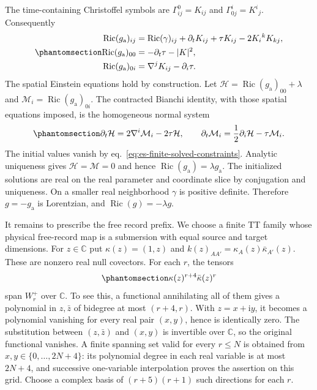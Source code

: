 \documentclass[
  english,
  11pt,
  reqno]{amsart}
\begin{document}
The time-containing Christoffel symbols are \(\Gamma^0_{ij}=K_{ij}\) and
\(\Gamma^i_{0j}=K^i{}_j\). Consequently
\begin{equation}\protect\phantomsection\label{eq:es-finite-gaussian-ricci}{\begin{aligned}
\operatorname{Ric}(g_{\mathrm a})_{ij}
 &=\operatorname{Ric}(\gamma)_{ij}
     +\partial_tK_{ij}+\tau K_{ij}-2K_i{}^kK_{kj}, \\
\operatorname{Ric}(g_{\mathrm a})_{00}&=-\partial_t\tau-|K|^2, \\
\operatorname{Ric}(g_{\mathrm a})_{0i}&=\nabla^jK_{ij}-\partial_i\tau.
\end{aligned}}\end{equation} The spatial Einstein equations hold by construction. Let
\(\mathcal H=\operatorname{Ric}(g_{\mathrm a})_{00}+\lambda\) and
\(\mathcal M_i=\operatorname{Ric}(g_{\mathrm a})_{0i}\). The contracted
Bianchi identity, with those spatial equations imposed, is the
homogeneous normal system
\begin{equation}\protect\phantomsection\label{eq:es-finite-constraint-propagation}{
 \partial_t\mathcal H
 =2\nabla^i\mathcal M_i-2\tau\mathcal H,
 \qquad
 \partial_t\mathcal M_i
 =\frac12\partial_i\mathcal H-\tau\mathcal M_i.
}\end{equation} The initial values vanish by
eq.~\ref{eq:es-finite-solved-constraints}. Analytic uniqueness gives
\(\mathcal H=\mathcal M=0\) and hence
\(\operatorname{Ric}(g_{\mathrm a})=\lambda g_{\mathrm a}\). The
initialized solutions are real on the real parameter and coordinate
slice by conjugation and uniqueness. On a smaller real neighborhood
\(\gamma\) is positive definite. Therefore \(g=-g_{\mathrm a}\) is
Lorentzian, and \(\operatorname{Ric}(g)=-\lambda g\).

It remains to prescribe the free record prefix. We choose a finite TT
family whose physical free-record map is a submersion with equal source
and target dimensions. For \(z\in\mathbb C\) put \(\kappa(z)=(1,z)\) and
\(k(z)_{AA'}=\kappa_A(z)\bar\kappa_{A'}(z)\). These are nonzero real
null covectors. For each \(r\), the tensors
\begin{equation}\protect\phantomsection\label{eq:es-finite-coherent-directions}{
 \kappa(z)^{r+4}\bar\kappa(z)^r
}\end{equation} span \(W_r^+\) over \(\mathbb C\). To see this, a
functional annihilating all of them gives a polynomial in \(z,\bar z\)
of bidegree at most \((r+4,r)\). With \(z=x+\mathrm i y\), it becomes a
polynomial vanishing for every real pair \((x,y)\), hence is identically
zero. The substitution between \((z,\bar z)\) and \((x,y)\) is
invertible over \(\mathbb C\), so the original functional vanishes. A
finite spanning set valid for every \(r\le N\) is obtained from
\(x,y\in\{0,\ldots,2N+4\}\): its polynomial degree in each real variable
is at most \(2N+4\), and successive one-variable interpolation proves
the assertion on this grid. Choose a complex basis of \((r+5)(r+1)\)
such directions for each \(r\).
\end{document}
